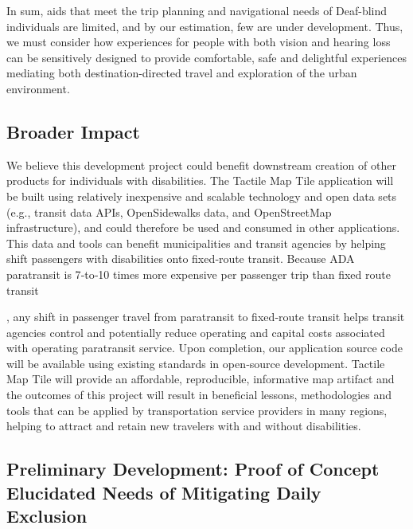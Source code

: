 In sum,  aids that meet the trip planning and navigational needs of Deaf-blind individuals are limited, and by our estimation, few are under development.
Thus, we must consider how experiences for people with both vision and hearing loss can be sensitively designed to provide comfortable, safe and delightful experiences mediating both destination-directed travel and exploration of the urban environment. 



\subsection{Broader Impact}
We believe this development project could benefit downstream creation of other products for individuals with disabilities.
The Tactile Map Tile application will be built using relatively inexpensive and scalable technology and open data sets (e.g., transit data APIs, OpenSidewalks data, and OpenStreetMap infrastructure), and could therefore be used and consumed in other applications. 
This data and tools can benefit municipalities and transit agencies by helping shift passengers with disabilities onto fixed‐route transit. 
Because ADA paratransit is 7‐to‐10 times more expensive per passenger trip than fixed route transit , any shift in passenger travel from paratransit to fixed‐route transit helps transit agencies control and potentially reduce operating and capital costs associated with
operating paratransit service. 
Upon completion, our application source code will be available using existing standards in open‐source development.
Tactile Map Tile will provide an affordable, reproducible, informative map artifact and the outcomes of this project will result in beneficial lessons, methodologies and tools that can be applied by transportation service providers in many regions, helping to attract and retain new travelers with and without disabilities.


\subsection{Preliminary Development: Proof of Concept Elucidated Needs of Mitigating Daily Exclusion}
\label{sec:pilot}

